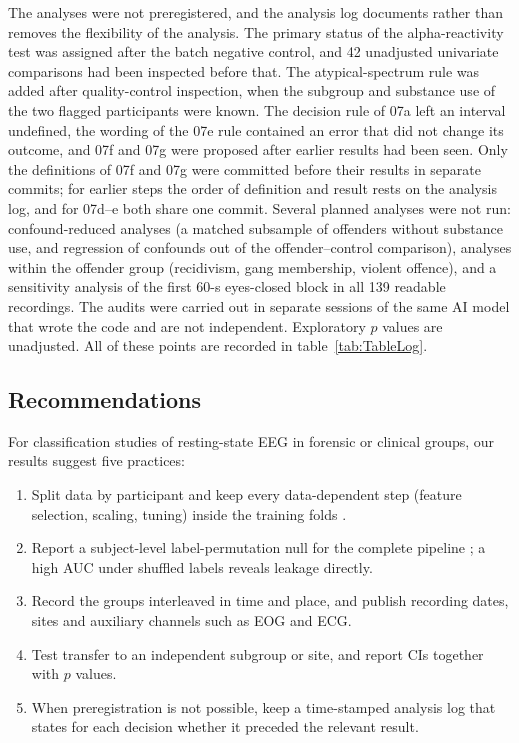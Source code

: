 The analyses were not preregistered, and the analysis log documents rather than removes the flexibility of the analysis. The primary status of the alpha-reactivity test was assigned after the batch negative control, and 42 unadjusted univariate comparisons had been inspected before that. The atypical-spectrum rule was added after quality-control inspection, when the subgroup and substance use of the two flagged participants were known. The decision rule of 07a left an interval undefined, the wording of the 07e rule contained an error that did not change its outcome, and 07f and 07g were proposed after earlier results had been seen. Only the definitions of 07f and 07g were committed before their results in separate commits; for earlier steps the order of definition and result rests on the analysis log, and for 07d--e both share one commit. Several planned analyses were not run: confound-reduced analyses (a matched subsample of offenders without substance use, and regression of confounds out of the offender--control comparison), analyses within the offender group (recidivism, gang membership, violent offence), and a sensitivity analysis of the first 60-s eyes-closed block in all 139 readable recordings. The audits were carried out in separate sessions of the same AI model that wrote the code and are not independent. Exploratory $p$ values are unadjusted. All of these points are recorded in table~\ref{tab:TableLog}.

\subsection{Recommendations}
\label{sec:disc-recommendations}

For classification studies of resting-state EEG in forensic or clinical groups, our results suggest five practices:
\begin{enumerate}
  \item Split data by participant and keep every data-dependent step (feature selection, scaling, tuning) inside the training folds \cite{Varma2006,Cawley2010}.
  \item Report a subject-level label-permutation null for the complete pipeline \cite{Ojala2010}; a high AUC under shuffled labels reveals leakage directly.
  \item Record the groups interleaved in time and place, and publish recording dates, sites and auxiliary channels such as EOG and ECG.
  \item Test transfer to an independent subgroup or site, and report CIs together with $p$ values.
  \item When preregistration is not possible, keep a time-stamped analysis log that states for each decision whether it preceded the relevant result.
\end{enumerate}

